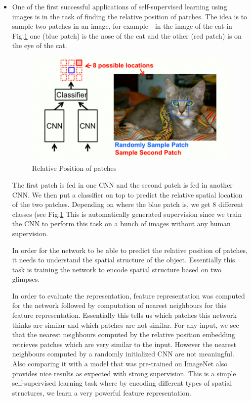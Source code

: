 \begin{itemize}
    
\item One of the first successful applications of self-supervised learning using images is in the task of finding the relative position of patches. The idea is to sample two patches in an image, for example - in the image of the cat in Fig.\ref{fig:1} one (blue patch) is the nose of the cat and the other (red patch) is on the eye of the cat. 

\begin{figure}[h!]
  \includegraphics[width=\linewidth]{RelativePosition.jpg}
  \caption{Relative Position of patches}
  \label{fig:1}
\end{figure}

The first patch is fed in one CNN and the second patch is fed in another CNN. We then put a classifier on top to predict the relative spatial location of the two patches. Depending on where the blue patch is, we get 8 different classes (see Fig.\ref{fig:1} This is automatically generated supervision since we train the CNN to perform this task on a bunch of images without any human supervision.

In order for the network to be able to predict the relative position of patches, it needs to understand the spatial structure of the object. Essentially this task is training the network to encode spatial structure based on two glimpses.

In order to evaluate the representation, feature representation was computed for the network followed by computation of nearest neighbours for this feature representation. Essentially this tells us which patches this network thinks are similar and which patches are not similar. For any input, we see that the nearest neighbours computed by the relative position embedding retrieves patches which are very similar to the input. However the nearest neighbours computed by a randomly initialized CNN are not meaningful. Also comparing it with a model that was pre-trained on ImageNet also provides nice results as expected with strong supervision. This is a simple self-supervised learning task where by encoding different types of spatial structures, we learn a very powerful feature representation.


\end{itemize}
